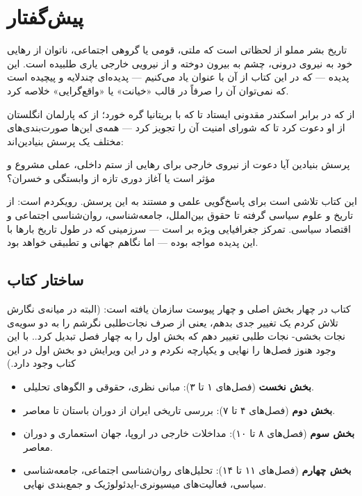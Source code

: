 \chapter*{پیش‌گفتار}

تاریخ بشر مملو از لحظاتی است که ملتی، قومی یا گروهی اجتماعی، ناتوان از رهایی خود به نیروی درونی، چشم به بیرون دوخته و از نیرویی خارجی یاری طلبیده است. این پدیده — که در این کتاب از آن با عنوان  یاد می‌کنیم — پدیده‌ای چندلایه و پیچیده است که نمی‌توان آن را صرفاً در قالب «خیانت» یا «واقع‌گرایی» خلاصه کرد.

از  که در برابر اسکندر مقدونی ایستاد تا  که با بریتانیا گره خورد؛ از  که پارلمان انگلستان از او دعوت کرد تا  که شورای امنیت آن را تجویز کرد — همه‌ی این‌ها صورت‌بندی‌های مختلف یک پرسش بنیادین‌اند:

\begin{histQuote}{پرسش بنیادین}
آیا دعوت از نیروی خارجی برای رهایی از ستم داخلی، عملی مشروع و مؤثر است یا آغاز دوری تازه از وابستگی و خسران؟
\end{histQuote}

این کتاب تلاشی است برای پاسخ‌گویی علمی و مستند به این پرسش. رویکردم  است: از تاریخ و علوم سیاسی گرفته تا حقوق بین‌الملل، جامعه‌شناسی، روان‌شناسی اجتماعی و اقتصاد سیاسی. تمرکز جغرافیایی ویژه بر  است — سرزمینی که در طول تاریخ بارها با این پدیده مواجه بوده — اما نگاهم جهانی و تطبیقی خواهد بود.

\section*{ساختار کتاب}

کتاب در چهار بخش اصلی و چهار پیوست سازمان یافته است: (البته در میانه‌ی نگارش تلاش کردم یک تغییر جدی بدهم، یعنی از صرف نجات‌طلبی نگرشم را به دو سویه‌ی نجات بخشی- نجات طلبی تغییر دهم که بخش اول را به چهار فصل تبدیل کرد.. با این وجود هنوز فصل‌ها را نهایی و یکپارچه نکردم و در این ویرایش دو بخش اول در این کتاب وجود دارد.)

\begin{itemize}[nosep, rightmargin=1em]
  \item \textbf{بخش نخست} (فصل‌های ۱ تا ۳): مبانی نظری، حقوقی و الگوهای تحلیلی.
  \item \textbf{بخش دوم} (فصل‌های ۴ تا ۷): بررسی تاریخی ایران از دوران باستان تا معاصر.
  \item \textbf{بخش سوم} (فصل‌های ۸ تا ۱۰): مداخلات خارجی در اروپا، جهان استعماری و دوران معاصر.
  \item \textbf{بخش چهارم} (فصل‌های ۱۱ تا ۱۴): تحلیل‌های روان‌شناسی اجتماعی، جامعه‌شناسی سیاسی، فعالیت‌های میسیونری-ایدئولوژیک و جمع‌بندی نهایی.
\end{itemize}

